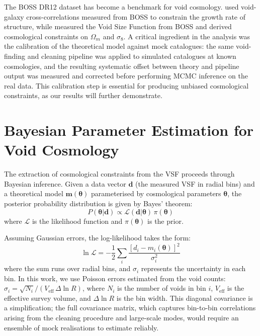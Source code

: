 \documentclass[12pt]{report}
\begin{document}
The BOSS DR12 dataset has become a benchmark for void cosmology. \citet{Hamaus2020} used void-galaxy cross-correlations measured from BOSS to constrain the growth rate of structure, while \citet{Contarini2023} measured the Void Size Function from BOSS and derived cosmological constraints on $\Omega_m$ and $\sigma_8$. A critical ingredient in the \citeauthor{Contarini2023} analysis was the calibration of the theoretical model against mock catalogues: the same void-finding and cleaning pipeline was applied to simulated catalogues at known cosmologies, and the resulting systematic offset between theory and pipeline output was measured and corrected before performing MCMC inference on the real data. This calibration step is essential for producing unbiased cosmological constraints, as our results will further demonstrate.


\section{Bayesian Parameter Estimation for Void Cosmology}
\label{sec:bayesian_background}

The extraction of cosmological constraints from the VSF proceeds through Bayesian inference. Given a data vector $\mathbf{d}$ (the measured VSF in radial bins) and a theoretical model $\mathbf{m}(\boldsymbol{\theta})$ parameterised by cosmological parameters $\boldsymbol{\theta}$, the posterior probability distribution is given by Bayes' theorem:
\begin{equation}
    P(\boldsymbol{\theta}|\mathbf{d}) \propto \mathcal{L}(\mathbf{d}|\boldsymbol{\theta})\,\pi(\boldsymbol{\theta})
    \label{eq:bayes}
\end{equation}
where $\mathcal{L}$ is the likelihood function and $\pi(\boldsymbol{\theta})$ is the prior.

Assuming Gaussian errors, the log-likelihood takes the form:
\begin{equation}
    \ln\mathcal{L} = -\frac{1}{2}\sum_i \frac{[d_i - m_i(\boldsymbol{\theta})]^2}{\sigma_i^2}
    \label{eq:gaussian_loglike}
\end{equation}
where the sum runs over radial bins, and $\sigma_i$ represents the uncertainty in each bin. In this work, we use Poisson errors estimated from the void counts: $\sigma_i = \sqrt{N_i}/(V_\mathrm{eff}\,\Delta\ln R)$, where $N_i$ is the number of voids in bin $i$, $V_\mathrm{eff}$ is the effective survey volume, and $\Delta\ln R$ is the bin width. This diagonal covariance is a simplification; the full covariance matrix, which captures bin-to-bin correlations arising from the cleaning procedure and large-scale modes, would require an ensemble of mock realisations to estimate reliably.
\end{document}
